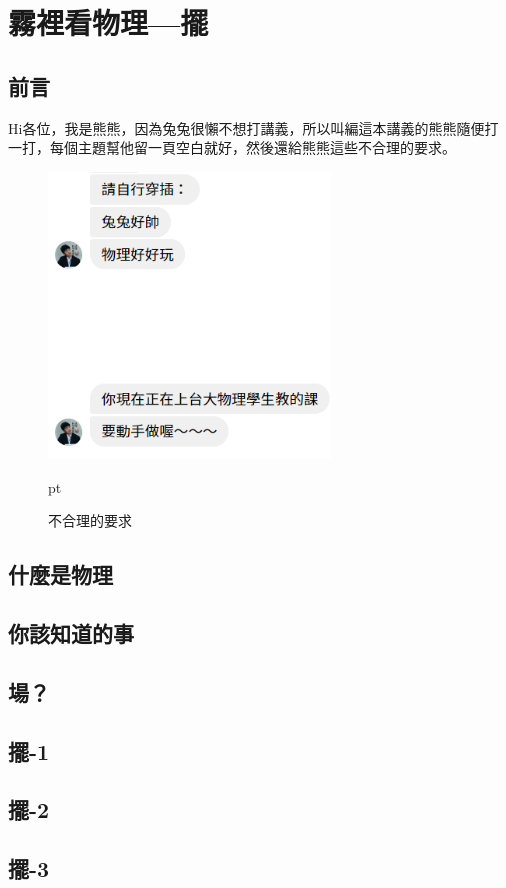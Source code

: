 \chapter{霧裡看物理—擺}

\setcounter{section}{-1}
\section{前言}
Hi各位，我是熊熊，因為兔兔很懶不想打講義，所以叫編這本講義的熊熊隨便打一打，每個主題幫他留一頁空白就好，然後還給熊熊這些不合理的要求。
\begin{figure}[H]
\centering
\graphicspath{{physics/}}
\includegraphics[width=7.5cm, center]{request.png}
\caption{不合理的要求}  pt
\label{fig:request}
\end{figure}
\newpage

\section{什麼是物理}
\newpage
\section{你該知道的事}
\newpage
\section{場？}
\newpage
\section{擺-1}
\newpage
\section{擺-2}
\newpage
\section{擺-3}
\newpage
